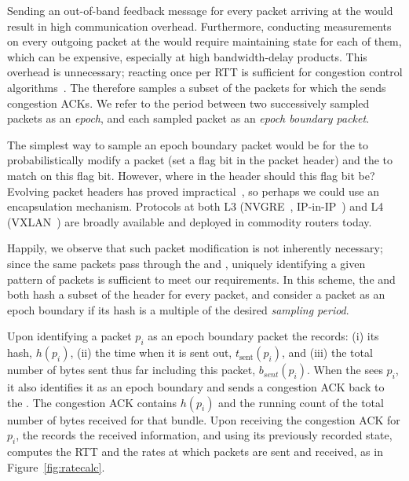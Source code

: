 Sending an out-of-band feedback message for every packet arriving at the \outbox would result in high communication overhead. 
Furthermore, conducting measurements on every outgoing packet at the \inbox would require maintaining state for each of them, which can be expensive, especially at high bandwidth-delay products. 
This overhead is unnecessary; reacting once per RTT is sufficient for congestion control algorithms~\cite{ccp}. 
The \inbox therefore samples a subset of the packets for which the \outbox sends congestion ACKs.
We refer to the period between two successively sampled packets as an \emph{epoch}, and each sampled packet as an \emph{epoch boundary packet}.

The simplest way to sample an epoch boundary packet would be for the \inbox to probabilistically modify a packet (\ie set a flag bit in the packet header) and the \outbox to match on this flag bit.
However, where in the header should this flag bit be?
Evolving packet headers has proved impractical~\cite{trotsky}, so perhaps we could use an encapsulation mechanism.
Protocols at both L3 (\eg NVGRE~\cite{nvgre}, IP-in-IP~\cite{ipinip}) and L4 (\eg VXLAN~\cite{vxlan}) are broadly available and deployed in commodity routers today.

Happily, we observe that such packet modification is not inherently necessary; since the same packets pass through the \inbox and \outbox, uniquely identifying a given pattern of packets is sufficient to meet our requirements. In this scheme, the \inbox and \outbox both hash a subset of the header for every packet, and consider a packet as an epoch boundary if its hash is a multiple of the desired \emph{sampling period}.

Upon identifying a packet $p_i$ as an epoch boundary packet the \inbox records: 
(i) its hash, $h(p_i)$, 
(ii) the time when it is sent out, $t_{\text{sent}}(p_i)$, 
and (iii) the total number of bytes sent thus far including this packet, $b_{sent}(p_i)$. 
When the \outbox sees $p_i$, it also identifies it as an epoch boundary and sends a congestion ACK back to the \inbox. 
The congestion ACK contains $h(p_i)$ and the running count of the total number of bytes received for that bundle. 
Upon receiving the congestion ACK for $p_i$, the \inbox records the received information, and using its previously recorded state, computes the RTT and the rates at which packets are sent and received, as in Figure~\ref{fig:ratecalc}.

 

